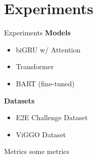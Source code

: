 \section{Experiments}
\begin{frame}{Experiments}
 \textbf{Models}   
\begin{itemize}
    \item biGRU w/ Attention
    \item Transformer
    \item BART (fine-tuned)
\end{itemize}

\textbf{Datasets}
\begin{itemize}
    \item E2E Challenge Dataset
    \item ViGGO Dataset
\end{itemize}
\end{frame}

\begin{frame}{Metrics}
some metrics
\end{frame}
